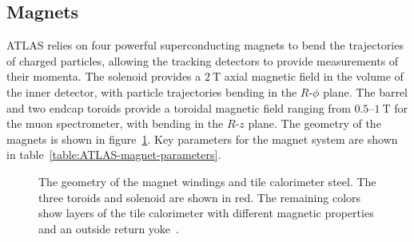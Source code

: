 \subsection{Magnets}\label{sec:ATLAS-magnets}
ATLAS relies on four powerful superconducting magnets to bend the trajectories of charged particles, allowing the tracking detectors to provide measurements of their momenta. The solenoid provides a $\SI{2}{\tesla}$ axial magnetic field in the volume of the inner detector, with particle trajectories bending in the $R$-$\phi$ plane. The barrel and two endcap toroids provide a toroidal magnetic field ranging from $0.5$--$\SI{1}{\tesla}$ for the muon spectrometer, with bending in the $R$-$z$ plane. The geometry of the magnets is shown in figure~\ref{fig:ATLAS-magnets-sketch}. Key parameters for the magnet system are shown in table~\ref{table:ATLAS-magnet-parameters}.

\begin{figure}[htbp]
	\centering
	\caption{The geometry of the magnet windings and tile calorimeter steel. The three toroids and solenoid are shown in red. The remaining colors show layers of the tile calorimeter with different magnetic properties and an outside return yoke~\cite{atlasphotos}.}
	\label{fig:ATLAS-magnets-sketch}
\end{figure}


